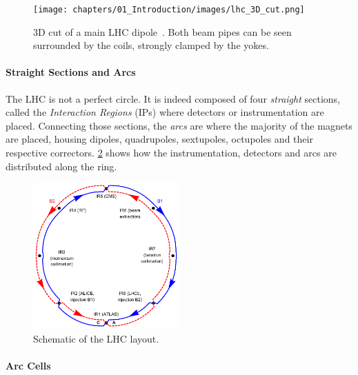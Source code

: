 \begin{figure}[H]
    \texttt{[image: chapters/01\_Introduction/images/lhc\_3D\_cut.png]}
    \caption{3D cut of a main LHC dipole~\cite{noauthor_cern_nodate}. Both beam pipes can be seen
    surrounded by the coils, strongly clamped by the yokes.}
    \label{fig:3d_cut_dipole}
\end{figure}


\paragraph{Straight Sections and Arcs}
The LHC is not a perfect circle. It is indeed composed of four \textit{straight} sections, called
the \textit{Interaction Regions} (IPs) where detectors or instrumentation are placed. Connecting
those sections, the \textit{arcs} are where the majority of the magnets are placed, housing dipoles,
quadrupoles, sextupoles, octupoles and their respective correctors. \cref{fig:introduction:lhc_irs}
shows how the instrumentation, detectors and arcs are distributed along the ring.

\begin{figure}[H]
    \centering
    \includegraphics[width=0.5\textwidth]{./images/irs.png}
    \caption{Schematic of the LHC layout.}
    \label{fig:introduction:lhc_irs}
\end{figure}


\paragraph{Arc Cells}

